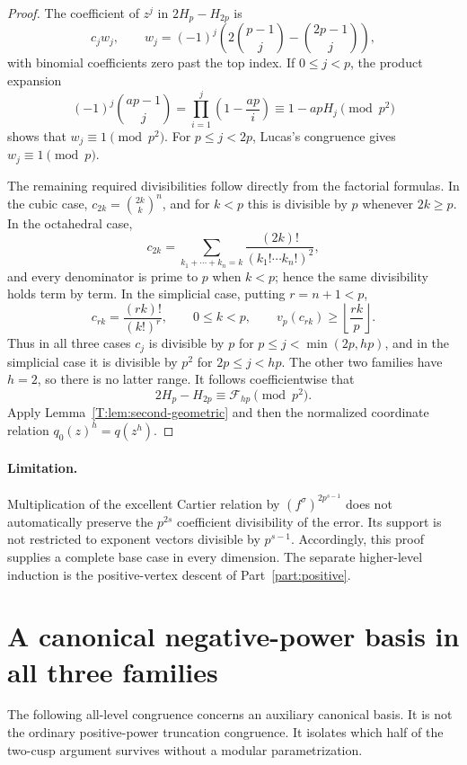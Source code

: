 \documentclass[11pt,a4paper]{article}
\theoremstyle{definition}\newtheorem{definition}[theorem]{Definition}
\theoremstyle{remark}\newtheorem{remark}[theorem]{Remark}
\numberwithin{equation}{section}
\begin{document}
\begin{proof}
The coefficient of \(z^j\) in \(2H_p-H_{2p}\) is
\[
 c_jw_j,\qquad
 w_j=(-1)^j\left(2\binom{p-1}{j}-\binom{2p-1}{j}\right),
\]
with binomial coefficients zero past the top index.  If \(0\leq j<p\),
the product expansion
\[
 (-1)^j\binom{ap-1}{j}
 =\prod_{i=1}^j\left(1-\frac{ap}{i}\right)
 \equiv1-apH_j\pmod{p^2}
\]
shows that \(w_j\equiv1\pmod{p^2}\).
For \(p\leq j<2p\), Lucas's congruence gives
\(w_j\equiv1\pmod p\).

The remaining required divisibilities follow directly from the
factorial formulas.  In the cubic case,
\(c_{2k}=\binom{2k}{k}^n\), and for \(k<p\) this is divisible by
\(p\) whenever \(2k\geq p\).
In the octahedral case,
\[
 c_{2k}=\sum_{k_1+\cdots+k_n=k}
              \frac{(2k)!}{(k_1!\cdots k_n!)^2},
\]
and every denominator is prime to \(p\) when \(k<p\); hence the
same divisibility holds term by term.
In the simplicial case, putting \(r=n+1<p\),
\[
 c_{rk}=\frac{(rk)!}{(k!)^r},\qquad 0\leq k<p,
 \qquad v_p(c_{rk})\geq\left\lfloor\frac{rk}{p}\right\rfloor.
\]
Thus in all three cases \(c_j\) is divisible by \(p\) for
\(p\leq j<\min(2p,hp)\), and in the simplicial case it is divisible
by \(p^2\) for \(2p\leq j<hp\).  The other two families have
\(h=2\), so there is no latter range.
It follows coefficientwise that
\[
 2H_p-H_{2p}\equiv\mathcal F_{hp}\pmod{p^2}.
\]
Apply Lemma~\ref{T:lem:second-geometric} and then the normalized
coordinate relation \(q_0(z)^h=q(z^h)\).
\end{proof}

\paragraph{Limitation.}
Multiplication of the excellent Cartier relation by
\((f^\sigma)^{2p^{s-1}}\) does not automatically preserve the
\(p^{2s}\) coefficient divisibility of the error.  Its support is
not restricted to exponent vectors divisible by \(p^{s-1}\).
Accordingly, this proof supplies a complete base case in every
dimension. The separate higher-level induction is the positive-vertex descent of Part~\ref{part:positive}.

\section{A canonical negative-power basis in all three families}\label{T:source-main-4}
\label{T:sec:negative-basis}

The following all-level congruence concerns an auxiliary canonical
basis.  It is not the ordinary positive-power truncation congruence.
It isolates which half of the two-cusp argument survives without a
modular parametrization.
\end{document}
